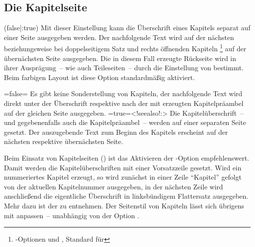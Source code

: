 \begin{DeclareEntity*}{}
\begin{DeclareEntity*}{}
\begin{DeclareEntity*}{}
\subsection{%
  Die Kapitelseite%
  \label{sec:chapter}%
}
%
\begin{Declaration}
  {}
  (false|:true)
Mit dieser Einstellung kann die Überschrift eines Kapitels separat auf einer 
Seite ausgegeben werden. Der nachfolgende Text wird auf der nächsten 
beziehungsweise bei doppelseitigem Satz und rechts öffnenden Kapiteln%
\footnote{%
  \KOMAScript-Optionen  und , 
  Standard für %
}
auf der übernächsten Seite ausgegeben. Die in diesem Fall erzeugte Rückseite 
wird in ihrer Ausprägung~-- wie auch Teileseiten~-- durch die Einstellung von 
 bestimmt. Beim farbigen Layout ist diese Option 
standardmäßig aktiviert. \notudscrartcl
\begin{DeclareValues}
\itemval=false=
  Es gibt keine Sonderstellung von Kapiteln, der nachfolgende Text wird direkt 
  unter der Überschrift respektive nach der mit  
  erzeugten Kapitelpräambel auf der gleichen Seite ausgegeben.
\itemval*=true=<!seealso!:>
  Die Kapitelüberschrift~-- und gegebenenfalls auch die Kapitelpräambel~-- 
  werden auf einer separaten Seite gesetzt. Der auszugebende Text zum Beginn 
  des Kapitels erscheint auf der nächsten respektive übernächsten Seite.
\end{DeclareValues}

Beim Einsatz von Kapitelseiten () ist das Aktivieren 
der \KOMAScript-Option  
empfehlenswert. Damit werden die Kapitelüberschriften mit einer Vorsatzzeile 
gesetzt. Wird ein nummeriertes Kapitel erzeugt, so wird zunächst in einer Zeile 
\enquote{Kapitel} gefolgt von der aktuellen Kapitelnummer ausgegeben, in der 
nächsten Zeile wird anschließend die eigentliche Überschrift in linksbündigem 
Flattersatz ausgegeben. Mehr dazu ist der  
zu entnehmen. Der Seitenstil von Kapiteln lässt sich übrigens mit 
anpassen~-- unabhängig von der Option .
\end{Declaration}


\end{DeclareEntity*}
\end{DeclareEntity*}
\end{DeclareEntity*}
